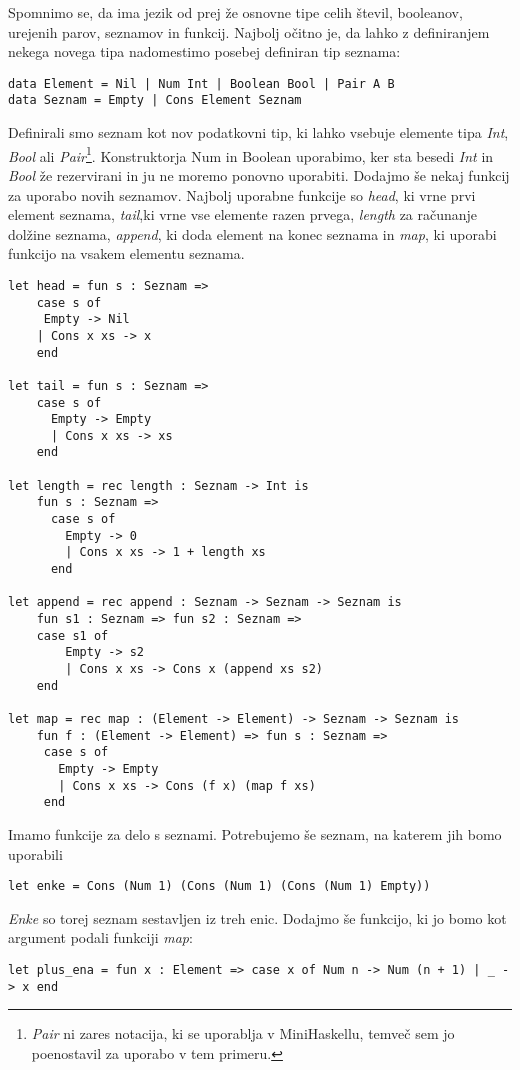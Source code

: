 \documentclass[12pt,a4paper,openany]{book}
\begin{document}
Spomnimo se, da ima jezik od prej že osnovne tipe celih števil, booleanov, urejenih parov, seznamov in funkcij. Najbolj očitno je, da lahko z definiranjem nekega novega tipa nadomestimo posebej 
definiran tip seznama:
\begin{lstlisting}
data Element = Nil | Num Int | Boolean Bool | Pair A B
data Seznam = Empty | Cons Element Seznam
\end{lstlisting}
Definirali smo seznam kot nov podatkovni tip, ki lahko vsebuje elemente tipa \emph{Int}, \emph{Bool} ali \emph{Pair}\footnote{\emph{Pair} ni zares notacija, ki se uporablja v MiniHaskellu, 
temveč sem jo poenostavil za uporabo v tem primeru.}. Konstruktorja Num in Boolean uporabimo, ker sta besedi \emph{Int} in \emph{Bool} že rezervirani in ju ne moremo ponovno uporabiti. Dodajmo 
še nekaj funkcij za uporabo novih seznamov. Najbolj uporabne funkcije so \emph{head}, ki vrne prvi element seznama, \emph{tail},ki vrne vse elemente razen prvega, \emph{length} za računanje 
dolžine seznama, \emph{append}, ki doda element na konec seznama in \emph{map}, ki uporabi funkcijo na vsakem elementu seznama. 
\begin{lstlisting}
let head = fun s : Seznam => 
    case s of
     Empty -> Nil
    | Cons x xs -> x
    end

let tail = fun s : Seznam =>
	case s of
	  Empty -> Empty
	  | Cons x xs -> xs
	end

let length = rec length : Seznam -> Int is
	fun s : Seznam =>
	  case s of
		Empty -> 0
		| Cons x xs -> 1 + length xs
	  end

let append = rec append : Seznam -> Seznam -> Seznam is
	fun s1 : Seznam => fun s2 : Seznam => 
	case s1 of
		Empty -> s2
		| Cons x xs -> Cons x (append xs s2)
	end

let map = rec map : (Element -> Element) -> Seznam -> Seznam is
	fun f : (Element -> Element) => fun s : Seznam =>
	 case s of
	   Empty -> Empty
	   | Cons x xs -> Cons (f x) (map f xs)
	 end
\end{lstlisting}
Imamo funkcije za delo s seznami. Potrebujemo še seznam, na katerem jih bomo uporabili
\begin{lstlisting}
let enke = Cons (Num 1) (Cons (Num 1) (Cons (Num 1) Empty))
\end{lstlisting}
\emph{Enke} so torej seznam sestavljen iz treh enic. Dodajmo še funkcijo, ki jo bomo kot argument podali funkciji \emph{map}:
\begin{lstlisting}
let plus_ena = fun x : Element => case x of Num n -> Num (n + 1) | _ -> x end
\end{lstlisting}
\end{document}

